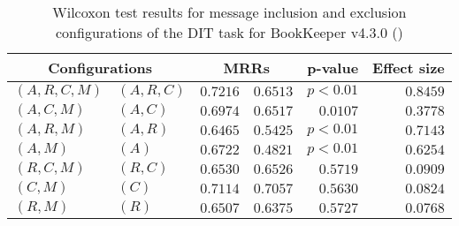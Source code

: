 
\begin{table}
\begin{spacing}{1.2}
\centering
\caption{Wilcoxon test results for message inclusion and exclusion configurations of the DIT task for BookKeeper v4.3.0 (\ctwo)}
\label{table:versus-wilcox-bookkeeper-dit-message}
\begin{tabular}{ll|rr|rr}
\toprule
      \multicolumn{2}{c|}{Configurations} &                \multicolumn{2}{c|}{MRRs} &        p-value & Effect size \\
\midrule
 $(A,R,C,M)$ &  $(A,R,C)$ &  $\bm{0.7216}$ &  $0.6513$ & $p<0.01$ &    $0.8459$ \\
   $(A,C,M)$ &    $(A,C)$ &  $\bm{0.6974}$ &  $0.6517$ & $0.0107$ &    $0.3778$ \\
   $(A,R,M)$ &    $(A,R)$ &  $\bm{0.6465}$ &  $0.5425$ & $p<0.01$ &    $0.7143$ \\
     $(A,M)$ &      $(A)$ &  $\bm{0.6722}$ &  $0.4821$ & $p<0.01$ &    $0.6254$ \\
   $(R,C,M)$ &    $(R,C)$ &  $\bm{0.6530}$ &  $0.6526$ & $0.5719$ &    $0.0909$ \\
     $(C,M)$ &      $(C)$ &  $\bm{0.7114}$ &  $0.7057$ & $0.5630$ &    $0.0824$ \\
     $(R,M)$ &      $(R)$ &  $\bm{0.6507}$ &  $0.6375$ & $0.5727$ &    $0.0768$ \\
\bottomrule
\end{tabular}

\end{spacing}
\end{table}

